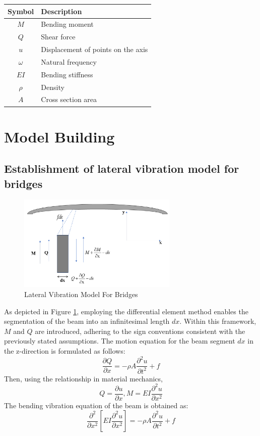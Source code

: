 \documentclass[conference]{IEEEtran}
\begin{document}
\begin{table}[h]
\centering
\begin{tabular}{cl}
\hline
Symbol & Description \\
\hline
\( M \) & Bending moment \\
\( Q \) & Shear force \\
\( u \) & Displacement of points on the axis \\
\( \omega \) & Natural frequency \\
\( EI \) & Bending stiffness \\
\( \rho \) & Density \\
\( A \) & Cross section area \\
\hline
\end{tabular}
\end{table}


\section{Model Building}
\subsection{Establishment of lateral vibration model for bridges}
\begin{figure}[ht!] %
\centering
\includegraphics[width=3.0in]{1.png}
\caption{Lateral Vibration Model For Bridges}
\label{1}
\end{figure}

As depicted in Figure \ref{1}, employing the differential element method enables the segmentation of the beam into an infinitesimal length \(dx\). Within this framework, \(M\) and \(Q\) are introduced, adhering to the sign conventions consistent with the previously stated assumptions. The motion equation for the beam segment \(dx\) in the z-direction is formulated as follows:
\begin{equation}
\frac{\partial Q}{\partial x} = -\rho A \frac{\partial^2 u}{\partial t^2} + f
\end{equation}
Then, using the relationship in material mechanics,
\begin{equation}
Q = \frac{\partial u}{\partial x}, M = EI\frac{\partial^2 u}{\partial x^2}
\end{equation}
The bending vibration equation of the beam is obtained as:
\begin{equation}
\frac{\partial^2}{\partial x^2}\left[EI\frac{\partial^2 u}{\partial x^2}\right] = -\rho A\frac{\partial^2 u}{\partial t^2} + f
\end{equation}
\end{document}
